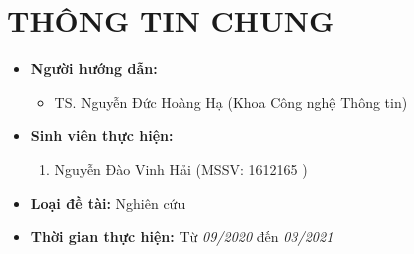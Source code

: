 \documentclass{article}[14pt]
\begin{document}
	\section{THÔNG TIN CHUNG}
	\begin{itemize}[label = {}]
		
		\item \textbf{Người hướng dẫn:} 
		
		\begin{itemize}
			\item TS. Nguyễn Đức Hoàng Hạ (Khoa Công nghệ Thông tin)
		\end{itemize}{}
		
		
		\item \textbf{Sinh viên thực hiện:}
		
		\begin{enumerate}
			
			\item Nguyễn Đào Vinh Hải (MSSV: 1612165 ) 
		\end{enumerate}
		
		\item \textbf{Loại đề tài:} Nghiên cứu
		
		\item \textbf{Thời gian thực hiện:} Từ \textit{09/2020} đến \textit{03/2021}
		
		
	\end{itemize}
	
\end{document}
